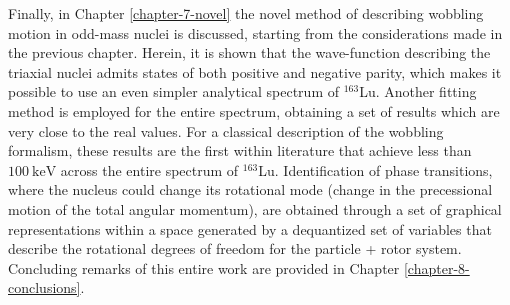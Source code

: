 Finally, in Chapter \ref{chapter-7-novel} the novel method of describing wobbling motion in odd-mass nuclei is discussed, starting from the considerations made in the previous chapter. Herein, it is shown that the wave-function describing the triaxial nuclei admits states of both positive and negative parity, which makes it possible to use an even simpler analytical spectrum of $^{163}$Lu. Another fitting method is employed for the entire spectrum, obtaining a set of results which are very close to the real values. For a classical description of the wobbling formalism, these results are the first within literature that achieve less than $100\ \text{keV}$ across the entire spectrum of $^{163}$Lu. Identification of phase transitions, where the nucleus could change its rotational mode (change in the precessional motion of the total angular momentum), are obtained through a set of graphical representations within a space generated by a dequantized set of variables that describe the rotational degrees of freedom for the particle + rotor system. Concluding remarks of this entire work are provided in Chapter \ref{chapter-8-conclusions}.